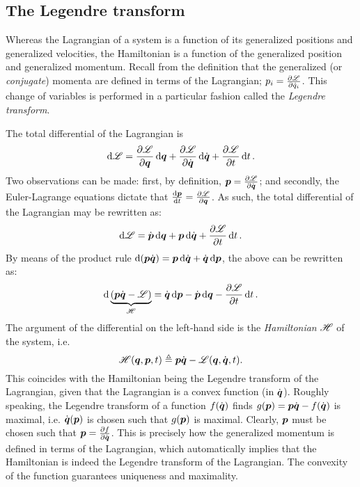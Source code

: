 \subsection{The Legendre transform}
Whereas the Lagrangian of a system is a function of its generalized positions and generalized velocities, the Hamiltonian is a function of the generalized position and generalized momentum. Recall from the definition that the generalized (or \emph{conjugate}) momenta are defined in terms of the Lagrangian; $p_i = \pdv{\ensuremath{\mathscr{L}}}{\dot{q}_i}$. This change of variables is performed in a particular fashion called the \emph{Legendre transform}.

The total differential of the Lagrangian is
$$ \dd{\ensuremath{\mathscr{L}}} = \pdv{\ensuremath{\mathscr{L}}}{\ensuremath{\vb*{q}}}\dd{\ensuremath{\vb*{q}}} + \pdv{\ensuremath{\mathscr{L}}}{\ensuremath{\dot{\vb*{q}}}}\dd{\ensuremath{\dot{\vb*{q}}}} + \pdv{\ensuremath{\mathscr{L}}}{t}\dd{t}. $$
Two observations can be made: first, by definition, $\vb*{p} = \pdv{\ensuremath{\mathscr{L}}}{\ensuremath{\dot{\vb*{q}}}}$; and secondly, the Euler-Lagrange equations dictate that $\dv{\ensuremath{\vb*{p}}}{t} = \pdv{\ensuremath{\mathscr{L}}}{\ensuremath{\vb*{q}}}$. As such, the total differential of the Lagrangian may be rewritten as: \cite{Landau1960}
$$ \dd{\ensuremath{\mathscr{L}}} = \dot{\vb*{p}}\dd{\ensuremath{\vb*{q}}} + \vb*{p} \dd{\ensuremath{\dot{\vb*{q}}}} + \pdv{\ensuremath{\mathscr{L}}}{t}\dd{t}.$$
By means of the product rule $\dd{(\gmom \gvel)} = \gmom\dd{\gvel} + \gvel\dd{\gmom}$, the above can be rewritten as: 
\begin{equation}
    \dd{\underbrace{(\gmom\gvel - \lag)}_{\ham}} = \gvel\dd{\gmom} - \dot{\gmom}\dd{\gpos} - \pdv{\lag}{t}\dd{t}.
    \label{eq:diff_hamiltonian}
\end{equation}
The argument of the differential on the left-hand side is the \emph{Hamiltonian} $\mathscr{H}$ of the system, i.e. 
$$ \mathscr{H}(\vb*{q}, \vb*{p}, t) \triangleq \vb*{p} \dot{\vb*{q}} - \mathscr{L}(\vb*{q}, \dot{\vb*{q}}, t). $$
This coincides with the Hamiltonian being the Legendre transform of the Lagrangian, given that the Lagrangian is a convex function (in $\dot{\vb*{q}}$). Roughly speaking, the Legendre transform of a function $f(\dot{\vb*{q}})$ finds $g(\vb*{p}) = \vb*{p}\dot{\vb*{q}} - f(\dot{\vb*{q}})$ is maximal, i.e. $\dot{\vb*{q}}(\vb*{p})$ is chosen such that $g(\vb*{p})$ is maximal. Clearly, $\vb*{p}$ must be chosen such that $\vb*{p} = \pdv{f}{\ensuremath{\dot{\vb*{q}}}}$. This is precisely how the generalized momentum is defined in terms of the Lagrangian, which automatically implies that the Hamiltonian is indeed the Legendre transform of the Lagrangian. The convexity of the function guarantees uniqueness and maximality.

